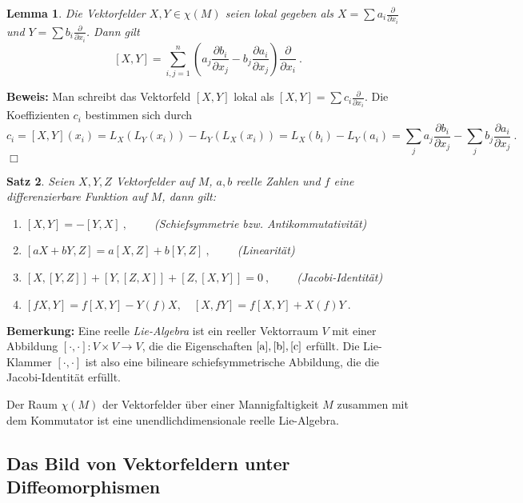 \documentclass[12pt,a4paper]{article}
\newtheorem{Lemma}{Lemma}[section]
\newtheorem{Satz}[Lemma]{Satz}
\def\proof{\noindent\textbf{Beweis:}\quad}
\def\qed{\quad\hfill\ensuremath{\Box}}
\begin{document}
\bigskip

\begin{Lemma}
Die Vektorfelder $X,Y\in \chi(M)$ seien lokal gegeben als
$X = \sum a_i \frac{\partial}{\partial x_i}$ und $Y = \sum b_i \frac{\partial}{\partial x_i}$.
Dann gilt
$$
[X,Y] = \sum^n_{i,j=1} \left( a_j \frac{\partial b_i}{\partial x_j} - b_j \frac{\partial a_i}{\partial x_j}
\right) \frac{\partial}{\partial x_i} \ .
$$
\end{Lemma}
\proof
Man schreibt das Vektorfeld $[X,Y]$ lokal als $[X,Y]= \sum c_i \frac{\partial }{\partial x_i}$. Die Koeffizienten
$c_i$ bestimmen sich durch
$$
c_i = [X,Y](x_i)= L_X(L_Y(x_i))-L_Y(L_X(x_i)) = L_X(b_i) - L_Y(a_i)= \sum_j  a_j \frac{\partial b_i}{\partial x_j}
-  \sum_j b_j \frac{\partial a_i}{\partial x_j} \ .
$$
\qed

\bigskip

\begin{Satz}
Seien $X,Y, Z$ Vektorfelder auf $M$, $a,b$ reelle Zahlen und $f$ eine differenzierbare Funktion
auf $M$, dann gilt:
\begin{enumerate}
\item\label{a}
$[X, Y] = - [Y,X] \ ,\qquad $  (Schiefsymmetrie bzw. Antikommutativit\"at)
\item\label{b}
$[a X + b Y, Z] = a [X, Z] +  b [Y, Z] \ ,\qquad $ (Linearit\"at)
\item\label{c}
$[X,[Y,Z]]  + [Y,[Z,X]]  + [Z,[X,Y]] = 0 \ ,\qquad $  (Jacobi-Identit\"at)
\item
$[fX,Y] = f[X,Y] - Y(f) X,\quad [X,f Y] = f[X,Y] + X(f)Y \ .$
\end{enumerate}
\end{Satz}

\bigskip

{\bf Bemerkung:}
Eine reelle {\it Lie-Algebra} ist ein reeller Vektorraum $V$ mit einer Abbildung
$[\cdot, \cdot] : V\times V \rightarrow V$, die die Eigenschaften
$\ref{a}, \ref{b}, \ref{c}$ erf\"ullt. Die Lie-Klammer $[\cdot, \cdot]$
ist also eine bilineare schiefsymmetrische Abbildung, die die Jacobi-Identit\"at erf\"ullt.

\medskip

Der Raum $\chi(M)$ der Vektorfelder \"uber einer Mannigfaltigkeit $M$ zusammen mit dem Kommutator ist eine
unendlichdimensionale reelle Lie-Algebra.


\subsection{Das Bild von Vektorfeldern unter Diffeomorphismen}
\end{document}

